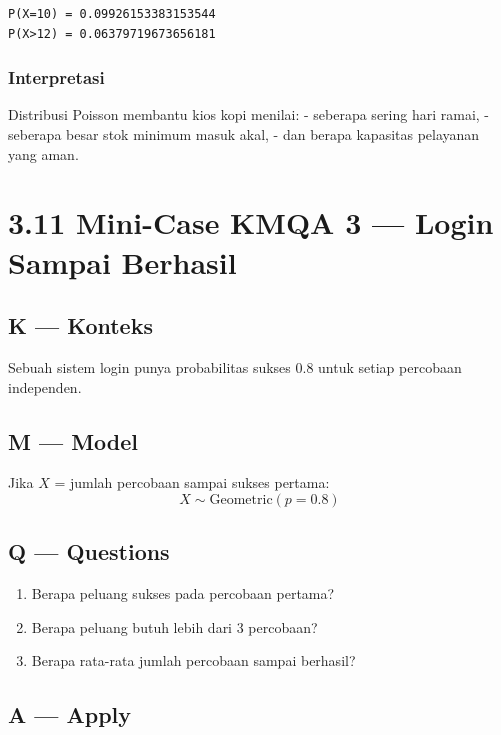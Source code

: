 \documentclass[
  letterpaper,
  DIV=11,
  numbers=noendperiod]{scrreprt}
\providecommand{\tightlist}{%
  \setlength{\itemsep}{0pt}\setlength{\parskip}{0pt}}
\begin{document}
\begin{verbatim}
P(X=10) = 0.09926153383153544
P(X>12) = 0.06379719673656181
\end{verbatim}

\subsubsection{Interpretasi}\label{interpretasi-9}

Distribusi Poisson membantu kios kopi menilai: - seberapa sering hari
ramai, - seberapa besar stok minimum masuk akal, - dan berapa kapasitas
pelayanan yang aman.

\section{3.11 Mini-Case KMQA 3 --- Login Sampai
Berhasil}\label{mini-case-kmqa-3-login-sampai-berhasil}

\subsection{K --- Konteks}\label{k-konteks-18}

Sebuah sistem login punya probabilitas sukses 0.8 untuk setiap percobaan
independen.

\subsection{M --- Model}\label{m-model-18}

Jika \(X\) = jumlah percobaan sampai sukses pertama: \[
X \sim \text{Geometric}(p=0.8)
\]

\subsection{Q --- Questions}\label{q-questions-18}

\begin{enumerate}
\def\labelenumi{\arabic{enumi}.}
\tightlist
\item
  Berapa peluang sukses pada percobaan pertama?
\item
  Berapa peluang butuh lebih dari 3 percobaan?
\item
  Berapa rata-rata jumlah percobaan sampai berhasil?
\end{enumerate}

\subsection{A --- Apply}\label{a-apply-18}
\end{document}
